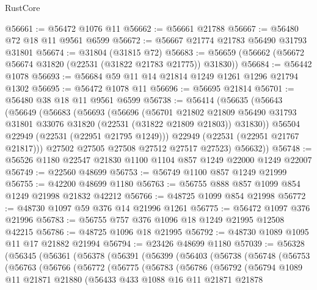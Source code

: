 \begin{lexlean}{RustCore}
\begin{coremodule}
@56661 := @56472 @1076 @11
@56662 := @56661 @21788
@56667 := @56480 @72 @18 @11 @9561 @6599
@56672 := @56667 @21774 @21783 @56490 @31793 @31801
@56674 := @31804 (@31815 @72)
@56683 := @56659 (@56662 (@56672 @56674 @31820 (@22531 (@31822 @21783 @21775)) @31830))
@56684 := @56442 @1078
@56693 := @56684 @59 @11 @14 @21814 @1249 @1261 @1296 @21794 @1302
@56695 := @56472 @1078 @11
@56696 := @56695 @21814
@56701 := @56480 @38 @18 @11 @9561 @6599
@56738 := @56414
    (@56635
      (@56643
        (@56649
          (@56683
            (@56693
              (@56696
                (@56701
                  @21802
                  @21809
                  @56490
                  @31793
                  @31801
                  @33076
                  @31820
                  (@22531 (@31822 @21809 @21803))
                  @31830))
              @56504
              @22949
              (@22531 (@22951 @21795 @1249)))
            @22949
            (@22531 (@22951 @21767 @21817)))
          @27502
          @27505
          @27508
          @27512
          @27517
          @27523)
        @56632))
@56748 := @56526 @1180 @22547 @21830 @1100 @1104 @857 @1249 @22000 @1249 @22007
@56749 := @22560 @48699
@56753 := @56749 @1100 @857 @1249 @21999
@56755 := @42200 @48699 @1180
@56763 := @56755 @888 @857 @1099 @854 @1249 @21998 @21832 @42212
@56766 := @48725 @1099 @854 @21998
@56772 := @48730 @1097 @59 @376 @14 @21996 @1261
@56775 := @56472 @1097 @376 @21996
@56783 := @56755 @757 @376 @1096 @18 @1249 @21995 @12508 @42215
@56786 := @48725 @1096 @18 @21995
@56792 := @48730 @1089 @1095 @11 @17 @21882 @21994
@56794 := @23426 @48699 @1180
@57039 := @56328
    (@56345
      (@56361
        (@56378
          (@56391
            (@56399
              (@56403
                (@56738
                  (@56748
                    (@56753
                      (@56763
                        (@56766
                          (@56772
                            (@56775
                              (@56783
                                (@56786
                                  (@56792
                                    (@56794
                                      @1089
                                      @11
                                      @21871
                                      @21880
                                      (@56433
                                        @433
                                        @1088
                                        @16
                                        @11
                                        @21871
                                        @21878

\end{coremodule}
\end{lexlean}
